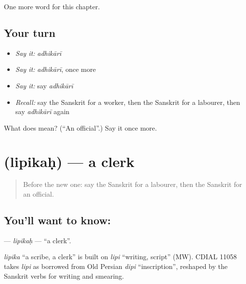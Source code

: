 \begin{grammarlens}[title={What you've built}]
One more word for this chapter.
\end{grammarlens}

\subsection*{Your turn}
\begin{itemize}
\raggedright
  \item \emph{Say it:} \emph{adhikārī}
  \item \emph{Say it:} \emph{adhikārī}, once more
  \item \emph{Say it:} say \emph{adhikārī}
  \item \emph{Recall:} say the Sanskrit for a worker, then the Sanskrit for a labourer, then say \emph{adhikārī} again
\end{itemize}

\begin{tcolorbox}[breakable,colback=teal!4,colframe=teal!35!black,title={Before you move on}]
What does  mean? (\textquotedblleft{}An official\textquotedblright{}.) Say it once more.
\end{tcolorbox}
\section[\texorpdfstring{\sk{लिपिकः} (lipikaḥ)}{लिपिकः (lipikaḥ)}]{ (lipikaḥ) — a clerk}

\label{lesson:SA-C149-lipikah}



\begin{quote}
Before the new one: say the Sanskrit for a labourer, then the Sanskrit for an official.
\end{quote}

\subsection*{You'll want to know: }
\textbf{} — \emph{lipikaḥ} — \textquotedblleft{}a clerk\textquotedblright{}.

\begin{cousinweb}
\emph{lipika} \textquotedblleft{}a scribe, a clerk\textquotedblright{} is built on \emph{lipi} \textquotedblleft{}writing, script\textquotedblright{} (MW). CDIAL 11058 takes \emph{lipi} as borrowed from Old Persian \emph{dipi} \textquotedblleft{}inscription\textquotedblright{}, reshaped by the Sanskrit verbs for writing and smearing.
\end{cousinweb}

